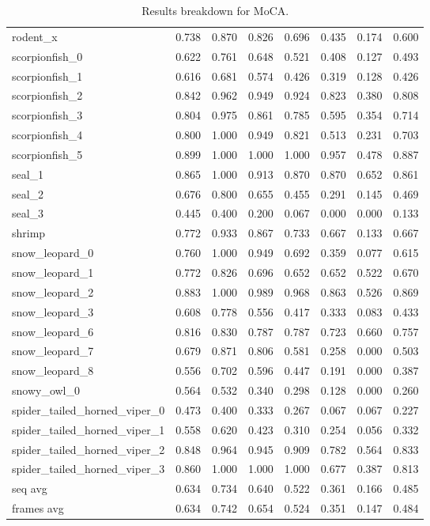 \begin{table*}[]
\begin{tabular}{l|c|cccccc}
rodent\_x & 0.738 & 0.870 & 0.826 & 0.696 & 0.435 & 0.174 & 0.600 \\
scorpionfish\_0 & 0.622 & 0.761 & 0.648 & 0.521 & 0.408 & 0.127 & 0.493 \\
scorpionfish\_1 & 0.616 & 0.681 & 0.574 & 0.426 & 0.319 & 0.128 & 0.426 \\
scorpionfish\_2 & 0.842 & 0.962 & 0.949 & 0.924 & 0.823 & 0.380 & 0.808 \\
scorpionfish\_3 & 0.804 & 0.975 & 0.861 & 0.785 & 0.595 & 0.354 & 0.714 \\
scorpionfish\_4 & 0.800 & 1.000 & 0.949 & 0.821 & 0.513 & 0.231 & 0.703 \\
scorpionfish\_5 & 0.899 & 1.000 & 1.000 & 1.000 & 0.957 & 0.478 & 0.887 \\
seal\_1 & 0.865 & 1.000 & 0.913 & 0.870 & 0.870 & 0.652 & 0.861 \\
seal\_2 & 0.676 & 0.800 & 0.655 & 0.455 & 0.291 & 0.145 & 0.469 \\
seal\_3 & 0.445 & 0.400 & 0.200 & 0.067 & 0.000 & 0.000 & 0.133 \\
shrimp & 0.772 & 0.933 & 0.867 & 0.733 & 0.667 & 0.133 & 0.667 \\
snow\_leopard\_0 & 0.760 & 1.000 & 0.949 & 0.692 & 0.359 & 0.077 & 0.615 \\
snow\_leopard\_1 & 0.772 & 0.826 & 0.696 & 0.652 & 0.652 & 0.522 & 0.670 \\
snow\_leopard\_2 & 0.883 & 1.000 & 0.989 & 0.968 & 0.863 & 0.526 & 0.869 \\
snow\_leopard\_3 & 0.608 & 0.778 & 0.556 & 0.417 & 0.333 & 0.083 & 0.433 \\
snow\_leopard\_6 & 0.816 & 0.830 & 0.787 & 0.787 & 0.723 & 0.660 & 0.757 \\
snow\_leopard\_7 & 0.679 & 0.871 & 0.806 & 0.581 & 0.258 & 0.000 & 0.503 \\
snow\_leopard\_8 & 0.556 & 0.702 & 0.596 & 0.447 & 0.191 & 0.000 & 0.387 \\
snowy\_owl\_0 & 0.564 & 0.532 & 0.340 & 0.298 & 0.128 & 0.000 & 0.260 \\
spider\_tailed\_horned\_viper\_0 & 0.473 & 0.400 & 0.333 & 0.267 & 0.067 & 0.067 & 0.227 \\
spider\_tailed\_horned\_viper\_1 & 0.558 & 0.620 & 0.423 & 0.310 & 0.254 & 0.056 & 0.332 \\
spider\_tailed\_horned\_viper\_2 & 0.848 & 0.964 & 0.945 & 0.909 & 0.782 & 0.564 & 0.833 \\
spider\_tailed\_horned\_viper\_3 & 0.860 & 1.000 & 1.000 & 1.000 & 0.677 & 0.387 & 0.813 \\ \hline
seq avg & 0.634 &	0.734 &	0.640 &	0.522 &	0.361 &	0.166 &	0.485 \\
frames avg & 0.634 & 0.742 & 0.654 & 0.524 & 0.351 & 0.147 & 0.484
\end{tabular}
\caption{Results breakdown for MoCA.}
\label{tab:moca2}
\end{table*}

